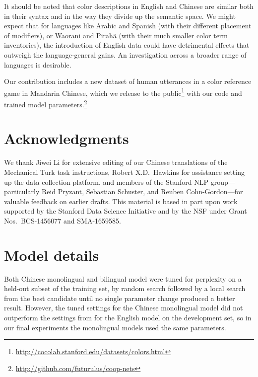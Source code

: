 \documentclass[11pt,a4paper]{article}
\renewcommand{\|}{\mid}
\begin{document}
It should be noted that color descriptions in English and Chinese are similar both in their syntax
and in the way they divide up the semantic space. We might expect that for languages like Arabic and Spanish (with their
different placement of modifiers), or Waorani and Pirah\~a (with their much smaller color term
inventories), the introduction of English data could have detrimental effects that 
outweigh the language-general gains. An investigation across a broader range of languages is desirable.

Our contribution includes a new dataset of human utterances in a color reference game in Mandarin Chinese, which we
release to the public\footnote{\url{http://cocolab.stanford.edu/datasets/colors.html}} with our code and trained model
parameters.\footnote{\url{http://github.com/futurulus/coop-nets}}

\section*{Acknowledgments}

We thank Jiwei Li for extensive editing of our Chinese translations of the Mechanical Turk task instructions, Robert X.D.\ Hawkins for assistance setting up the data collection platform, and members of the Stanford NLP group---particularly Reid Pryzant, Sebastian Schuster, and Reuben Cohn-Gordon---for valuable feedback on earlier drafts. 
This material is based in part upon work supported by the Stanford Data Science Initiative and by the NSF under Grant Nos.~BCS-1456077 and SMA-1659585.




\appendix

\section{Model details} \label{sec:appendix}

Both Chinese monolingual and bilingual model were tuned for perplexity on a held-out subset of the training set,
by random search followed by a local search from the best candidate until no single parameter change produced a better
result. However, the tuned settings for the Chinese monolingual model did not outperform the settings from
\citet{Monroe2017} for the English model on the development set, so in our final experiments the monolingual models
used the same parameters.
\end{document}
